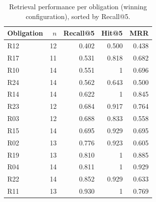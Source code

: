 \begin{table}[htbp]
  \centering
  \caption{Retrieval performance per obligation (winning configuration), sorted by Recall@5.}
  \label{tab:retrieval-per-req}
  \begin{tabular}{lrrrr}
    \toprule
    Obligation & $n$ & Recall@5 & Hit@5 & MRR \\
    \midrule
    R12 & 12 & 0.402 & 0.500 & 0.438 \\
    R17 & 11 & 0.531 & 0.818 & 0.682 \\
    R10 & 14 & 0.551 & 1 & 0.696 \\
    R24 & 14 & 0.562 & 0.643 & 0.500 \\
    R14 & 14 & 0.622 & 1 & 0.845 \\
    R23 & 12 & 0.684 & 0.917 & 0.764 \\
    R03 & 12 & 0.688 & 0.833 & 0.558 \\
    R15 & 14 & 0.695 & 0.929 & 0.695 \\
    R02 & 13 & 0.776 & 0.923 & 0.605 \\
    R19 & 13 & 0.810 & 1 & 0.885 \\
    R04 & 14 & 0.811 & 1 & 0.929 \\
    R22 & 14 & 0.852 & 0.929 & 0.633 \\
    R11 & 13 & 0.930 & 1 & 0.769 \\
    \bottomrule
  \end{tabular}
\end{table}
